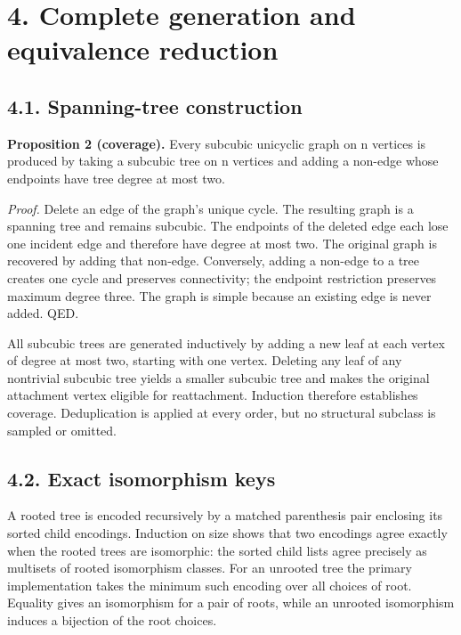 \documentclass[
]{article}
\begin{document}
\section{4. Complete generation and equivalence
reduction}\label{complete-generation-and-equivalence-reduction}

\subsection{4.1. Spanning-tree
construction}\label{spanning-tree-construction}

\textbf{Proposition 2 (coverage).} Every subcubic unicyclic graph on n
vertices is produced by taking a subcubic tree on n vertices and adding
a non-edge whose endpoints have tree degree at most two.

\emph{Proof.} Delete an edge of the graph's unique cycle. The resulting
graph is a spanning tree and remains subcubic. The endpoints of the
deleted edge each lose one incident edge and therefore have degree at
most two. The original graph is recovered by adding that non-edge.
Conversely, adding a non-edge to a tree creates one cycle and preserves
connectivity; the endpoint restriction preserves maximum degree three.
The graph is simple because an existing edge is never added. QED.

All subcubic trees are generated inductively by adding a new leaf at
each vertex of degree at most two, starting with one vertex. Deleting
any leaf of any nontrivial subcubic tree yields a smaller subcubic tree
and makes the original attachment vertex eligible for reattachment.
Induction therefore establishes coverage. Deduplication is applied at
every order, but no structural subclass is sampled or omitted.

\subsection{4.2. Exact isomorphism keys}\label{exact-isomorphism-keys}

A rooted tree is encoded recursively by a matched parenthesis pair
enclosing its sorted child encodings. Induction on size shows that two
encodings agree exactly when the rooted trees are isomorphic: the sorted
child lists agree precisely as multisets of rooted isomorphism classes.
For an unrooted tree the primary implementation takes the minimum such
encoding over all choices of root. Equality gives an isomorphism for a
pair of roots, while an unrooted isomorphism induces a bijection of the
root choices.
\end{document}

